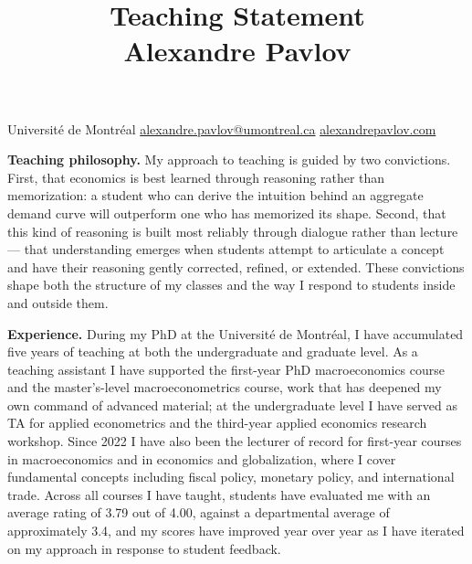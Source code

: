 \documentclass[11pt]{article}
\title{\vspace{-2em}\textbf{Teaching Statement}\\[0.3em]\large Alexandre Pavlov}
\author{}
\date{}
\begin{document}
\maketitle
\vspace{-3em}

\begin{center}
\small Université de Montréal \hspace{0.5em}\textbar\hspace{0.5em}
\href{mailto:alexandre.pavlov@umontreal.ca}{alexandre.pavlov@umontreal.ca} \hspace{0.5em}\textbar\hspace{0.5em}
\href{https://alexandrepavlov.com/}{alexandrepavlov.com}
\end{center}
\vspace{0.5em}

\textbf{Teaching philosophy.}
My approach to teaching is guided by two convictions. First, that economics is best learned through reasoning rather than memorization: a student who can derive the intuition behind an aggregate demand curve will outperform one who has memorized its shape. Second, that this kind of reasoning is built most reliably through dialogue rather than lecture --- that understanding emerges when students attempt to articulate a concept and have their reasoning gently corrected, refined, or extended. These convictions shape both the structure of my classes and the way I respond to students inside and outside them.

\textbf{Experience.}
During my PhD at the Université de Montréal, I have accumulated five years of teaching at both the undergraduate and graduate level. As a teaching assistant I have supported the first-year PhD macroeconomics course and the master's-level macroeconometrics course, work that has deepened my own command of advanced material; at the undergraduate level I have served as TA for applied econometrics and the third-year applied economics research workshop. Since 2022 I have also been the lecturer of record for first-year courses in macroeconomics and in economics and globalization, where I cover fundamental concepts including fiscal policy, monetary policy, and international trade. Across all courses I have taught, students have evaluated me with an average rating of 3.79 out of 4.00, against a departmental average of approximately 3.4, and my scores have improved year over year as I have iterated on my approach in response to student feedback.
\end{document}
